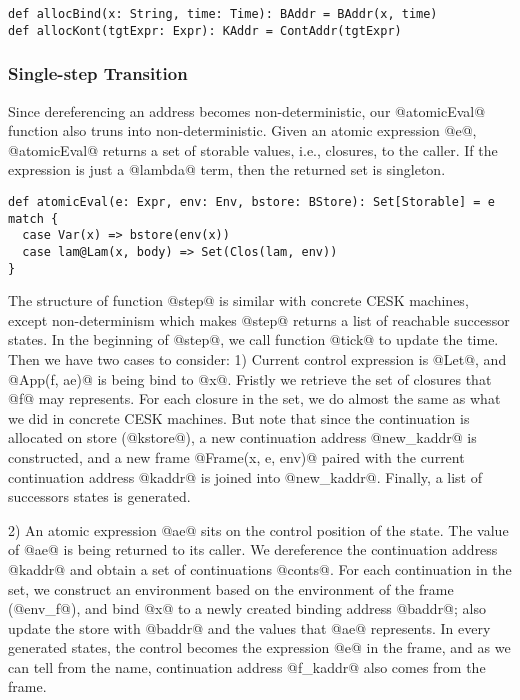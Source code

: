 \documentclass[acmsmall,review,anonymous]{acmart}\settopmatter{printfolios=true,printccs=false,printacmref=false}
\begin{document}
\begin{lstlisting}
def allocBind(x: String, time: Time): BAddr = BAddr(x, time)
def allocKont(tgtExpr: Expr): KAddr = ContAddr(tgtExpr)
\end{lstlisting}

\subsubsection{Single-step Transition}

Since dereferencing an address becomes non-deterministic, our @atomicEval@
function also truns into non-deterministic. Given an atomic expression @e@,
@atomicEval@ returns a set of storable values, i.e., closures, to the caller.
If the expression is just a @lambda@ term, then the returned set is singleton.

\begin{lstlisting}
def atomicEval(e: Expr, env: Env, bstore: BStore): Set[Storable] = e match {
  case Var(x) => bstore(env(x))
  case lam@Lam(x, body) => Set(Clos(lam, env))
}
\end{lstlisting}

The structure of function @step@ is similar with concrete CESK machines, 
except non-determinism which makes @step@ returns a list of reachable 
successor states.
In the beginning of @step@, we call function @tick@ to update 
the time.
Then we have two cases to consider: 1) Current control expression is @Let@,
and @App(f, ae)@ is being bind to @x@.
Fristly we retrieve the set of closures that @f@ may represents.
For each closure in the set, we do almost the same as what we did in concrete 
CESK machines. But note that since the continuation is allocated on store (@kstore@),
a new continuation address @new_kaddr@ is constructed, and a new frame
@Frame(x, e, env)@ paired with the current continuation address @kaddr@
is joined into @new_kaddr@. Finally, a list of successors states is generated.

2) An atomic expression @ae@ sits on the control position of the state.
The value of @ae@ is being returned to its caller. 
We dereference the continuation address @kaddr@ and obtain a set of
continuations @conts@.
For each continuation in the set, we construct an environment based on the
environment of the frame (@env_f@), and bind @x@ to a newly created binding 
address @baddr@; also update the store with @baddr@ and 
the values that @ae@ represents. In every generated states,
the control becomes the expression @e@ in the frame,
and as we can tell from the name, continuation address @f_kaddr@
also comes from the frame.
\end{document}
